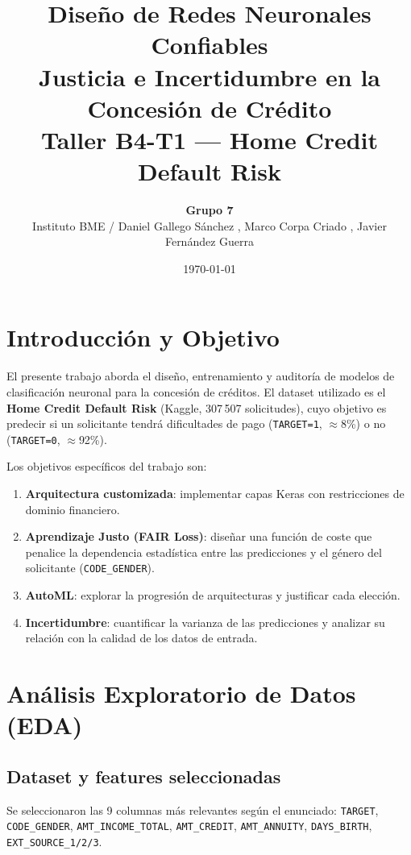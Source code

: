 \documentclass[12pt,a4paper]{article}
\title{
    \vspace{-1cm}
    \Large\textbf{Diseño de Redes Neuronales Confiables}\\[0.4cm]
    \large Justicia e Incertidumbre en la Concesión de Crédito\\[0.3cm]
    \normalsize Taller B4-T1 — Home Credit Default Risk
}
\author{
    \textbf{Grupo 7} \\[0.2cm]
    \small Instituto BME /
    Daniel Gallego Sánchez , Marco Corpa Criado , Javier	Fernández Guerra
}
\date{\today}
\begin{document}
\maketitle
\tableofcontents
\newpage

\section{Introducción y Objetivo}
\label{sec:intro}

El presente trabajo aborda el diseño, entrenamiento y auditoría de modelos
de clasificación neuronal para la concesión de créditos. El dataset utilizado
es el \textbf{Home Credit Default Risk} (Kaggle, 307\,507 solicitudes),
cuyo objetivo es predecir si un solicitante tendrá dificultades de pago
(\texttt{TARGET=1}, $\approx$8\%) o no (\texttt{TARGET=0}, $\approx$92\%).

Los objetivos específicos del trabajo son:

\begin{enumerate}[leftmargin=*, label=\textbf{\arabic*.}]
    \item \textbf{Arquitectura customizada}: implementar capas Keras con
          restricciones de dominio financiero.
    \item \textbf{Aprendizaje Justo (FAIR Loss)}: diseñar una función de
          coste que penalice la dependencia estadística entre las predicciones
          y el género del solicitante (\texttt{CODE\_GENDER}).
    \item \textbf{AutoML}: explorar la progresión de arquitecturas y
          justificar cada elección.
    \item \textbf{Incertidumbre}: cuantificar la varianza de las predicciones
          y analizar su relación con la calidad de los datos de entrada.
\end{enumerate}

\section{Análisis Exploratorio de Datos (EDA)}
\label{sec:eda}

\subsection{Dataset y features seleccionadas}

Se seleccionaron las 9 columnas más relevantes según el enunciado:
\texttt{TARGET}, \texttt{CODE\_GENDER}, \texttt{AMT\_INCOME\_TOTAL},
\texttt{AMT\_CREDIT}, \texttt{AMT\_ANNUITY}, \texttt{DAYS\_BIRTH},
\texttt{EXT\_SOURCE\_1/2/3}.
\end{document}
